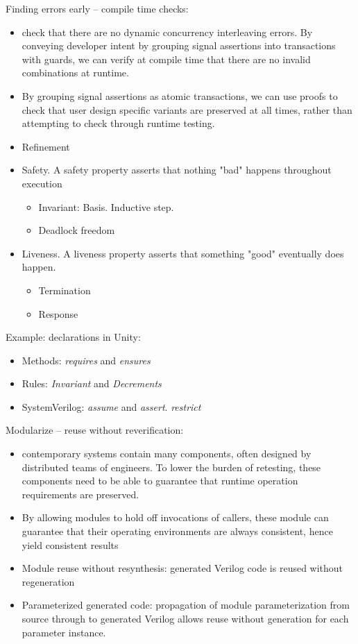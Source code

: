 Finding errors early -- compile time checks:
\begin{itemize}
\item check that there are no dynamic concurrency interleaving errors.  By 
conveying developer intent by grouping
signal assertions into transactions with guards, we can verify at compile time
that there are no invalid combinations at runtime.
\item By grouping signal assertions as atomic transactions, we can use proofs
to check that user design specific variants are preserved at all times, rather
than attempting to check through runtime testing.
\item Refinement
\item Safety. A safety property asserts that nothing "bad" happens throughout execution
\begin{itemize}
\item Invariant:  Basis.  Inductive step.
\item Deadlock freedom
\end{itemize}
\item Liveness. A liveness property asserts that something "good" eventually does happen.
\begin{itemize}
\item Termination
\item Response
\end{itemize}
\end{itemize}

Example: declarations in Unity:
\begin{itemize}
\item Methods: \textit{requires} and \textit{ensures}
\item Rules: \textit{Invariant} and \textit{Decrements}
\item SystemVerilog: \textit{assume} and \textit{assert}.  \textit{restrict}
\end{itemize}

Modularize -- reuse without reverification:
\begin{itemize}
\item contemporary systems contain many components,
often designed by distributed teams of engineers.  To lower the burden
of retesting, these components need to be able to guarantee that
runtime operation requirements are preserved.
\item By allowing modules to hold off invocations of callers, these module
can guarantee that their operating environments are always consistent, hence
yield consistent results
\item Module reuse without resynthesis: generated Verilog code is reused without regeneration
\item Parameterized generated code: propagation of module parameterization from
source through to generated Verilog allows reuse without generation for each parameter instance.
\end{itemize}

